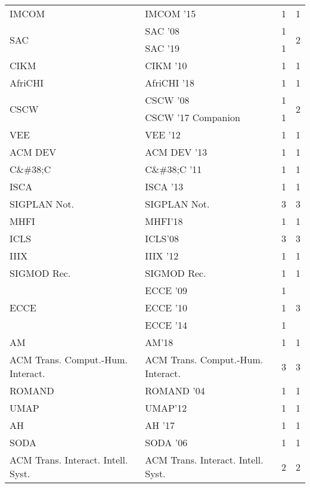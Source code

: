 \begin{table*}[t]
\begin{tabular}{llrr}
\multirow{1}{*}{IMCOM } & IMCOM '15 & 1 & \multirow{1}{*}{1}\\
\multirow{2}{*}{SAC } & SAC '08 & 1 & \multirow{2}{*}{2}\\
& SAC '19 & 1 &\\
\multirow{1}{*}{CIKM } & CIKM '10 & 1 & \multirow{1}{*}{1}\\
\multirow{1}{*}{AfriCHI } & AfriCHI '18 & 1 & \multirow{1}{*}{1}\\
\multirow{2}{*}{CSCW } & CSCW '08 & 1 & \multirow{2}{*}{2}\\
& CSCW '17 Companion & 1 &\\
\multirow{1}{*}{VEE } & VEE '12 & 1 & \multirow{1}{*}{1}\\
\multirow{1}{*}{ACM DEV } & ACM DEV '13 & 1 & \multirow{1}{*}{1}\\
\multirow{1}{*}{C\&\#38;C } & C\&\#38;C '11 & 1 & \multirow{1}{*}{1}\\
\multirow{1}{*}{ISCA } & ISCA '13 & 1 & \multirow{1}{*}{1}\\
\multirow{1}{*}{SIGPLAN Not.} & SIGPLAN Not. & 3 & \multirow{1}{*}{3}\\
\multirow{1}{*}{MHFI} & MHFI'18 & 1 & \multirow{1}{*}{1}\\
\multirow{1}{*}{ICLS} & ICLS'08 & 3 & \multirow{1}{*}{3}\\
\multirow{1}{*}{IIIX } & IIIX '12 & 1 & \multirow{1}{*}{1}\\
\multirow{1}{*}{SIGMOD Rec.} & SIGMOD Rec. & 1 & \multirow{1}{*}{1}\\
\multirow{3}{*}{ECCE } & ECCE '09 & 1 & \multirow{3}{*}{3}\\
& ECCE '10 & 1 &\\
& ECCE '14 & 1 &\\
\multirow{1}{*}{AM} & AM'18 & 1 & \multirow{1}{*}{1}\\
\multirow{1}{*}{ACM Trans. Comput.-Hum. Interact.} & ACM Trans. Comput.-Hum. Interact. & 3 & \multirow{1}{*}{3}\\
\multirow{1}{*}{ROMAND } & ROMAND '04 & 1 & \multirow{1}{*}{1}\\
\multirow{1}{*}{UMAP} & UMAP'12 & 1 & \multirow{1}{*}{1}\\
\multirow{1}{*}{AH } & AH '17 & 1 & \multirow{1}{*}{1}\\
\multirow{1}{*}{SODA } & SODA '06 & 1 & \multirow{1}{*}{1}\\
\multirow{1}{*}{ACM Trans. Interact. Intell. Syst.} & ACM Trans. Interact. Intell. Syst. & 2 & \multirow{1}{*}{2}\\

\end{tabular}
\end{table*}
